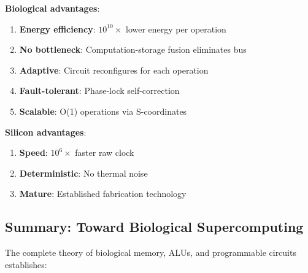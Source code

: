 \documentclass[11pt,a4paper]{article}
\begin{document}
\textbf{Biological advantages}:
\begin{enumerate}
\item \textbf{Energy efficiency}: $10^{10}\times$ lower energy per operation
\item \textbf{No bottleneck}: Computation-storage fusion eliminates bus
\item \textbf{Adaptive}: Circuit reconfigures for each operation
\item \textbf{Fault-tolerant}: Phase-lock self-correction
\item \textbf{Scalable}: O(1) operations via S-coordinates
\end{enumerate}

\textbf{Silicon advantages}:
\begin{enumerate}
\item \textbf{Speed}: $10^6\times$ faster raw clock
\item \textbf{Deterministic}: No thermal noise
\item \textbf{Mature}: Established fabrication technology
\end{enumerate}

\subsection{Summary: Toward Biological Supercomputing}

The complete theory of biological memory, ALUs, and programmable circuits establishes:
\end{document}
